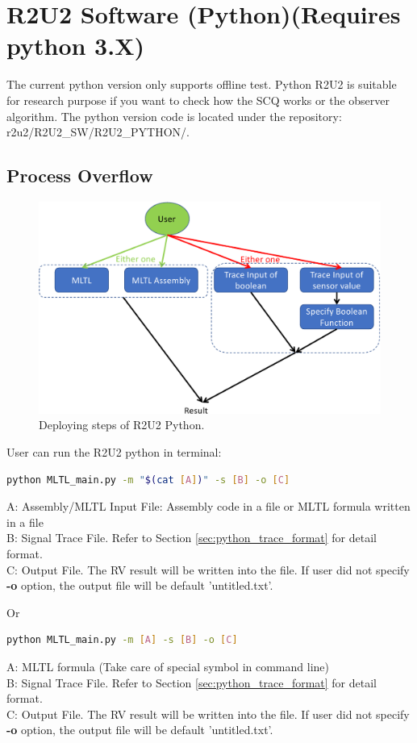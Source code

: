 \section{R2U2 Software (Python)(Requires python 3.X)}
The current python version only supports offline test. Python R2U2 is suitable for research purpose if you want to check how the SCQ works or the observer algorithm.
The python version code is located under the repository: \colorbox{gray!30}{r2u2/R2U2\_SW/R2U2\_PYTHON/}.
\subsection{Process Overflow}
\begin{figure}[H]
	\includegraphics[scale=0.50]{fig/r2u2_python_flow.pdf}
	\caption{Deploying steps of R2U2 Python.}
	\label{fig:python_flow}
\end{figure}

User can run the R2U2 python in terminal:
\begin{lstlisting}[language=Bash]
	python MLTL_main.py -m "$(cat [A])" -s [B] -o [C]
\end{lstlisting}
\begin{tcolorbox}
A: Assembly/MLTL Input File: Assembly code in a file or MLTL formula written in a file\\
B: Signal Trace File. Refer to Section \ref{sec:python_trace_format} for detail format. \\
C: Output File. The RV result will be written into the file. If user did not specify \textbf{-o} option, the output file will be default 'untitled.txt'.
\end{tcolorbox}
Or
\begin{lstlisting}[language=Bash]
	python MLTL_main.py -m [A] -s [B] -o [C]
\end{lstlisting}
\begin{tcolorbox}
A: MLTL formula (Take care of special symbol in command line)\\
B: Signal Trace File. Refer to Section \ref{sec:python_trace_format} for detail format. \\
C: Output File. The RV result will be written into the file. If user did not specify \textbf{-o} option, the output file will be default 'untitled.txt'.
\end{tcolorbox}


